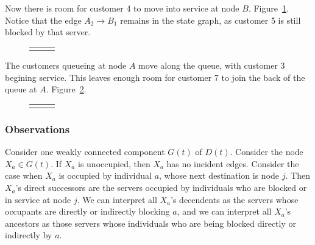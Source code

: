 \documentclass{article}
\begin{document}
Now there is room for customer 4 to move into service at node $B$. Figure~\ref{fig:general_builddown_3}.
Notice that the edge $A_2 \longrightarrow B_1$ remains in the state graph, as customer 5 is still blocked by that server.

\begin{figure}[H]
  \begin{center}
    \begin{tabular}{ c c c }
       & \hspace{0.1\textwidth} &
       \\
  \end{tabular}
  \end{center}
  \caption{}
  \label{fig:general_builddown_3}
\end{figure}

The customers queueing at node $A$ move along the queue, with customer 3 begining service.
This leaves enough room for customer 7 to join the back of the queue at $A$. Figure~\ref{fig:general_builddown_4}.

\begin{figure}[H]
  \begin{center}
    \begin{tabular}{ c c c }
       & \hspace{0.1\textwidth} &
       \\
  \end{tabular}
  \end{center}
  \caption{}
  \label{fig:general_builddown_4}
\end{figure}

\subsubsection*{Observations}

Consider one weakly connected component $G(t)$ of $D(t)$.
Consider the node $X_a \in G(t)$. If $X_a$ is unoccupied, then $X_a$ has no incident edges.
Consider the case when $X_a$ is occupied by individual $a$, whose next destination is node $j$.
Then $X_a$'s direct successors are the servers occupied by individuals who are blocked or in service at node $j$.
We can interpret all $X_a$'s decendents as the servers whose occupants are directly or indirectly blocking $a$, and we can interpret all $X_a$'s ancestors as those servers whose individuals who are being blocked directly or indirectly by $a$.
\end{document}
